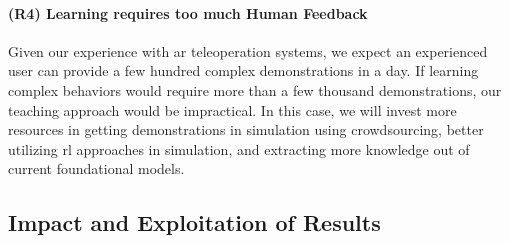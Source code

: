 \documentclass{erc-B2}
\begin{document}
\paragraph{(R4) Learning requires too much Human Feedback}
Given our experience with \gls*{ar} teleoperation systems, we expect an experienced user can provide a few hundred complex demonstrations in a day. If learning complex behaviors would require more than a few thousand demonstrations, our teaching approach would be impractical. In this case, we will invest more resources in getting demonstrations in simulation using crowdsourcing, better utilizing \gls*{rl} approaches in simulation, and extracting more knowledge out of current foundational models. 




\subsection{Impact and Exploitation of Results}
\label{sec:impact}

\end{document}

